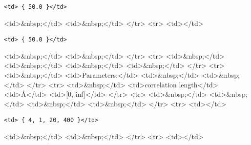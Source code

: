 \begin{verbatim}
<td> { 50.0 }</td>
\end{verbatim}

\textless{}td\textgreater{}\&nbsp;\textless{}/td\textgreater{} \textless{}td\textgreater{}\&nbsp;\textless{}/td\textgreater{} \textless{}/tr\textgreater{} \textless{}tr\textgreater{} \textless{}td\textgreater{}\textless{}/td\textgreater{}

\begin{verbatim}
<td> { 50.0 }</td>
\end{verbatim}

\textless{}td\textgreater{}\&nbsp;\textless{}/td\textgreater{} \textless{}td\textgreater{}\&nbsp;\textless{}/td\textgreater{} \textless{}/tr\textgreater{} \textless{}tr\textgreater{} \textless{}td\textgreater{}\&nbsp;\textless{}/td\textgreater{} \textless{}td\textgreater{}\&nbsp;\textless{}/td\textgreater{} \textless{}td\textgreater{}\&nbsp;\textless{}/td\textgreater{} \textless{}td\textgreater{}\&nbsp;\textless{}/td\textgreater{} \textless{}/tr\textgreater{} \textless{}tr\textgreater{} \textless{}td\textgreater{}\&nbsp;\textless{}/td\textgreater{} \textless{}td\textgreater{}Parameters:\textless{}/td\textgreater{} \textless{}td\textgreater{}\&nbsp;\textless{}/td\textgreater{} \textless{}td\textgreater{}\&nbsp;\textless{}/td\textgreater{} \textless{}/tr\textgreater{} \textless{}tr\textgreater{} \textless{}td\textgreater{}\&nbsp;\textless{}/td\textgreater{} \textless{}td\textgreater{}correlation length\textless{}/td\textgreater{} \textless{}td\textgreater{}\AA{}\textless{}/td\textgreater{} \textless{}td\textgreater{}[0, inf]\textless{}/td\textgreater{} \textless{}/tr\textgreater{} \textless{}tr\textgreater{} \textless{}td\textgreater{}\&nbsp;\textless{}/td\textgreater{} \textless{}td\textgreater{}\&nbsp;\textless{}/td\textgreater{} \textless{}td\textgreater{}\&nbsp;\textless{}/td\textgreater{} \textless{}td\textgreater{}\&nbsp;\textless{}/td\textgreater{} \textless{}/tr\textgreater{} \textless{}tr\textgreater{} \textless{}td\textgreater{}\textless{}/td\textgreater{}

\begin{verbatim}
<td> { 4, 1, 20, 400 }</td>
\end{verbatim}

\textless{}td\textgreater{}\&nbsp;\textless{}/td\textgreater{} \textless{}td\textgreater{}\&nbsp;\textless{}/td\textgreater{} \textless{}/tr\textgreater{} \textless{}tr\textgreater{} \textless{}td\textgreater{}\textless{}/td\textgreater{}

